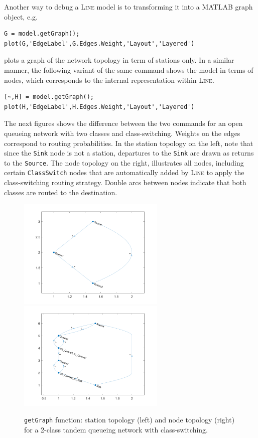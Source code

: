 Another way to debug a \textsc{Line} model is to transforming it into a MATLAB graph object, e.g.
\begin{lstlisting}
G = model.getGraph();
plot(G,'EdgeLabel',G.Edges.Weight,'Layout','Layered')
\end{lstlisting}
plots a graph of the network topology in term of stations only. In a similar manner, the following variant of the same command shows the model in terms of nodes, which corresponds to the internal representation within \textsc{Line}.
\begin{lstlisting}
[~,H] = model.getGraph();
plot(H,'EdgeLabel',H.Edges.Weight,'Layout','Layered')
\end{lstlisting}
The next figures shows the difference between the two commands for an open queueing network with two classes and class-switching. Weights on the edges correspond to routing probabilities. In the station topology on the left, note that since the \texttt{Sink} node is not a station, departures to the \texttt{Sink} are drawn as returns to the \texttt{Source}. The node topology on the right, illustrates all nodes, including certain \texttt{ClassSwitch} nodes that are automatically added by \textsc{Line} to apply the class-switching routing strategy. Double arcs between nodes indicate that both classes are routed to the destination.
\begin{figure}
  \centering
  \includegraphics[width=7cm]{./images/getGraph_Stations.png}
  \includegraphics[width=7cm]{./images/getGraph_Nodes.png}
  \caption{\texttt{getGraph} function: station topology (left) and node topology (right) for a 2-class tandem queueing network with class-switching.}\label{FIG_getGraph}
\end{figure}

